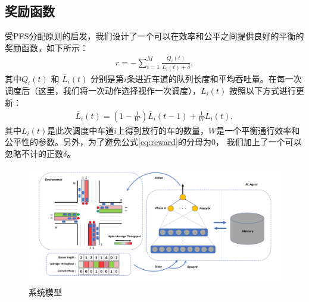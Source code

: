 \subsection*{奖励函数}
受PFS分配原则的启发，我们设计了一个可以在效率和公平之间提供良好的平衡的奖励函数，如下所示：
\begin{align}
\label{eq:reward}
    r = -\sum_{i=1}^{M} \frac{Q_i(t)}{\overline{L}_i(t) + \delta},
\end{align}
其中$Q_i(t)$ 和 $\overline{L}_i(t)$ 分别是第$i$条进近车道的队列长度和平均吞吐量。在每一次调度后（这里，我们将一次动作选择视作一次调度），$\overline{L}_i(t)$ 按照以下方式进行更新：
\begin{align}
    \overline{L}_i(t) = (1-\frac{1}{W})\overline{L}_i(t-1) + \frac{1}{W}L_i(t),
\end{align}
其中$L_i(t)$是此次调度中车道$i$上得到放行的车的数量，$W$是一个平衡通行效率和公平性的参数。另外，为了避免公式\ref{eq:reward}的分母为0， 我们加上了一个可以忽略不计的正数$\delta$。

\begin{figure}[htb]
  \includegraphics[width=.9\textwidth]{fig/sysmodel.pdf}
  \caption{系统模型}
  \label{fig:system-model}
\end{figure}

